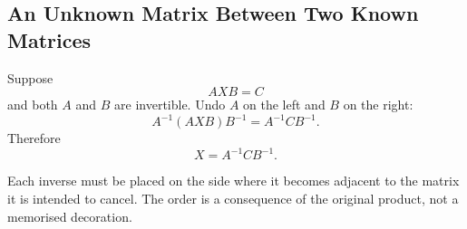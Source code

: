 \subsection{An Unknown Matrix Between Two Known Matrices}

Suppose
\[
AXB=C
\]
and both $A$ and $B$ are invertible. Undo $A$ on the left and $B$ on the right:
\[
A^{-1}(AXB)B^{-1}=A^{-1}CB^{-1}.
\]
Therefore
\[
\boxed{X=A^{-1}CB^{-1}}.
\]

\begin{interpretationbox}
Each inverse must be placed on the side where it becomes adjacent to the matrix it is intended to cancel. The order is a consequence of the original product, not a memorised decoration.
\end{interpretationbox}
